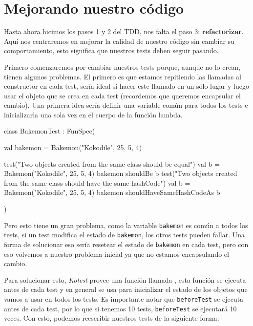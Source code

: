 \section{Mejorando nuestro código}
\label{sec:refactor}

  Hasta ahora hicimos los pasos 1 y 2 del TDD, nos falta el paso 3: \textbf{refactorizar}.
  Aquí nos centraremos en mejorar la calidad de nuestro código sin cambiar su comportamiento, esto
  significa que nuestros tests deben seguir pasando.

  Primero comenzaremos por cambiar nuestros tests porque, aunque no lo crean, tienen algunos 
  problemas.
  El primero es que estamos repitiendo las llamadas al constructor en cada test, sería ideal si
  hacer este llamado en un sólo lugar y luego usar el objeto que se crea en cada test (recordemos
  que queremos encapsular el cambio).
  Una primera idea sería definir una variable común para todos los tests e inicializarla una sola 
  vez en el cuerpo de la función lambda.

  \begin{kotlin}
    class BakemonTest : FunSpec({
      val bakemon = Bakemon("Kokodile", 25, 5, 4)

      test("Two objects created from the same class should be equal") {
        val b = Bakemon("Kokodile", 25, 5, 4)
        bakemon shouldBe b
      }
      test("Two objects created from the same class should have the same hashCode") {
        val b = Bakemon("Kokodile", 25, 5, 4)
        bakemon shouldHaveSameHashCodeAs b
      }
    })
  \end{kotlin}

  Pero esto tiene un gran problema, como la variable \texttt{bakemon} es común a todos los tests,
  si un test modifica el estado de \texttt{bakemon}, los otros tests pueden fallar.
  Una forma de solucionar eso sería resetear el estado de \texttt{bakemon} en cada test, pero
  con eso volvemos a nuestro problema inicial ya que no estamos encapsulando el cambio.

  Para solucionar esto, \textit{Kotest} provee una función llamada , esta 
  función se ejecuta antes de cada test y en general se usa para inicializar el estado de los 
  objetos que vamos a usar en todos los tests.
  Es importante notar que \texttt{beforeTest} se ejecuta antes de cada test, por lo que si tenemos
  10 tests, \texttt{beforeTest} se ejecutará 10 veces.
  Con esto, podemos reescribir nuestros tests de la siguiente forma:


